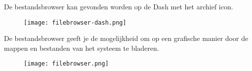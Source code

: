 De bestandsbrowser kan gevonden worden op de Dash met het archief icon.
\begin{figure}[H]
\texttt{[image: filebrowser-dash.png]}
\end{figure}

De bestandsbrowser geeft je de mogelijkheid om op een grafische manier door de mappen en bestanden van het systeem te bladeren.
\begin{center}
\begin{figure}[H]
\texttt{[image: filebrowser.png]}
\end{figure}
\end{center}



